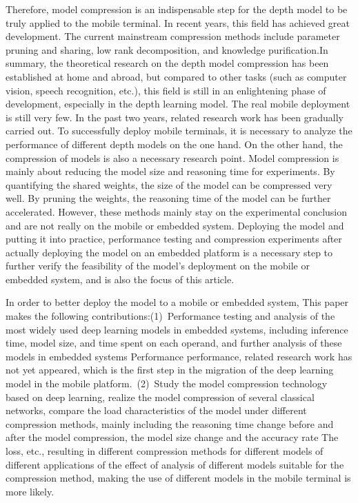 Therefore, model compression is an indispensable step for the depth model to be truly applied to the mobile terminal. In recent years, this field has achieved great development. The current mainstream compression methods include parameter pruning and sharing, low rank decomposition, and knowledge purification.In summary, the theoretical research on the depth model compression has been established at home and abroad, but compared to other tasks (such as computer vision, speech recognition, etc.), this field is still in an enlightening phase of development, especially in the depth learning model. The real mobile deployment is still very few. In the past two years, related research work has been gradually carried out. To successfully deploy mobile terminals, it is necessary to analyze the performance of different depth models on the one hand. On the other hand, the compression of models is also a necessary research point. Model compression is mainly about reducing the model size and reasoning time for experiments. By quantifying the shared weights, the size of the model can be compressed very well. By pruning the weights, the reasoning time of the model can be further accelerated. However, these methods mainly stay on the experimental conclusion and are not really on the mobile or embedded system. Deploying the model and putting it into practice, performance testing and compression experiments after actually deploying the model on an embedded platform is a necessary step to further verify the feasibility of the model's deployment on the mobile or embedded system, and is also the focus of this article.

In order to better deploy the model to a mobile or embedded system, This paper makes the following contributions:(1)\ Performance testing and analysis of the most widely used deep learning models in embedded systems, including inference time, model size, and time spent on each operand, and further analysis of these models in embedded systems Performance performance, related research work has not yet appeared, which is the first step in the migration of the deep learning model in the mobile platform.\ (2)\ Study the model compression technology based on deep learning, realize the model compression of several classical networks, compare the load characteristics of the model under different compression methods, mainly including the reasoning time change before and after the model compression, the model size change and the accuracy rate The loss, etc., resulting in different compression methods for different models of different applications of the effect of analysis of different models suitable for the compression method, making the use of different models in the mobile terminal is more likely.
